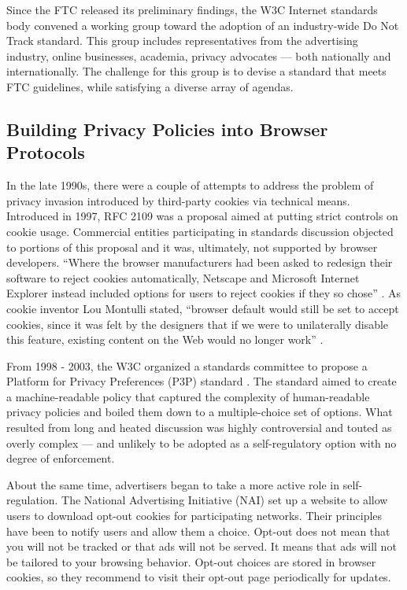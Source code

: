 Since the FTC released its preliminary findings, the W3C Internet standards body convened a working group toward the adoption of an industry-wide Do Not Track standard. This group includes representatives from the advertising industry, online businesses, academia, privacy advocates --- both nationally and internationally. The challenge for this group is to devise a standard that meets FTC guidelines, while satisfying a diverse array of agendas.

\subsection{Building Privacy Policies into Browser Protocols}
\label{buildingprivacypoliciesintobrowserprotocols}

In the late 1990s, there were a couple of attempts to address the problem of privacy invasion introduced by third-party cookies via technical means. Introduced in 1997, RFC 2109 was a proposal aimed at putting strict controls on cookie usage. Commercial entities participating in standards discussion objected to portions of this proposal and it was, ultimately, not supported by browser developers. ``Where the browser manufacturers had been asked to redesign their software to reject cookies automatically, Netscape and Microsoft Internet Explorer instead included options for users to reject cookies if they so chose''  \citep{Eichelberger:um}.  As cookie inventor Lou Montulli stated, ``browser default would still be set to accept cookies, since it was felt by the designers that if we were to unilaterally disable this feature, existing content on the Web would no longer work''  \citep{Bruner:1997ti}. 

From 1998 - 2003, the W3C organized a standards committee to propose a Platform for Privacy Preferences (P3P) standard  \citep{Schwartz:2009tc}.  The standard aimed to create a machine-readable policy that captured the complexity of human-readable privacy policies and boiled them down to a multiple-choice set of options. What resulted from long and heated discussion was highly controversial and touted as overly complex --- and unlikely to be adopted as a self-regulatory option with no degree of enforcement.

About the same time, advertisers began to take a more active role in self-regulation. The National Advertising Initiative (NAI) set up a website to allow users to download opt-out cookies for participating networks. Their principles have been to notify users and allow them a choice. Opt-out does not mean that you will not be tracked or that ads will not be served. It means that ads will not be tailored to your browsing behavior. Opt-out choices are stored in browser cookies, so they recommend to visit their opt-out page periodically for updates. 

